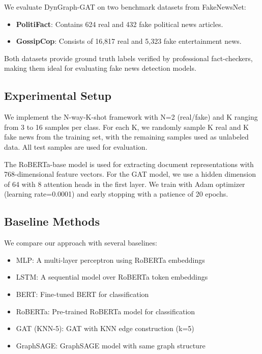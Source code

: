 \documentclass[conference]{IEEEtran}
\begin{document}
We evaluate DynGraph-GAT on two benchmark datasets from FakeNewsNet\cite{shu2020fakenewsnet}:

\begin{itemize}
    \item \textbf{PolitiFact}: Contains 624 real and 432 fake political news articles.
    \item \textbf{GossipCop}: Consists of 16,817 real and 5,323 fake entertainment news.
\end{itemize}

Both datasets provide ground truth labels verified by professional fact-checkers, making them ideal for evaluating fake news detection models.

\subsection{Experimental Setup}
\label{subsec:setup}

We implement the N-way-K-shot framework with N=2 (real/fake) and K ranging from 3 to 16 samples per class. For each K, we randomly sample K real and K fake news from the training set, with the remaining samples used as unlabeled data. All test samples are used for evaluation.

The RoBERTa-base model is used for extracting document representations with 768-dimensional feature vectors. For the GAT model, we use a hidden dimension of 64 with 8 attention heads in the first layer. We train with Adam optimizer (learning rate=0.0001) and early stopping with a patience of 20 epochs.

\subsection{Baseline Methods}
\label{subsec:baselines}

We compare our approach with several baselines:
\begin{itemize}
    \item MLP: A multi-layer perceptron using RoBERTa embeddings
    \item LSTM: A sequential model over RoBERTa token embeddings
    \item BERT: Fine-tuned BERT for classification
    \item RoBERTa: Pre-trained RoBERTa model for classification
    \item GAT (KNN-5): GAT with KNN edge construction (k=5)
    \item GraphSAGE: GraphSAGE model with same graph structure\cite{hamilton2017inductive}
\end{itemize}
\end{document}

